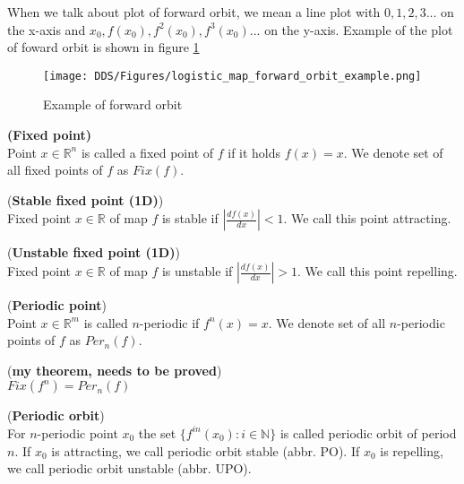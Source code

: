 \begin{remark}
    When we talk about plot of forward orbit, we mean a line plot with
    $0, 1, 2, 3...$ on the x-axis and $x_0, f(x_0), f^2(x_0), f^3(x_0)...$ on the y-axis.
    Example of the plot of foward orbit is shown in figure \ref{fig:forward_orbit_example}
\end{remark}

\begin{figure}[!h]
    \centering
    \texttt{[image: DDS/Figures/logistic\_map\_forward\_orbit\_example.png]}
    \caption{Example of forward orbit}
    \label{fig:forward_orbit_example}
\end{figure}


\begin{definition} \textbf{(Fixed point)} \\
    \label{def:fixed point}
    Point $x \in \mathbb{R}^n$ is called a fixed point of $f$ if it holds $f(x) = x$.
    We denote set of all fixed points of $f$ as $Fix(f)$. \cite{Devaney20211026}
\end{definition}

\begin{definition} (\textbf{Stable fixed point (1D)})\\
    Fixed point $x \in \mathbb{R}$ of map $f$ is stable if $|\frac{d{f(x)}}{dx}| < 1$.
    We call this point attracting.
\end{definition}

\begin{definition} (\textbf{Unstable fixed point (1D)})\\
    Fixed point $x \in \mathbb{R}$ of map $f$ is unstable if $|\frac{d{f(x)}}{dx}| > 1$.
    We call this point repelling.
\end{definition}

\begin{definition} (\textbf{Periodic point})\\
    Point $x \in \mathbb{R}^m$ is called $n$-periodic if $f^{n}(x)=x$.
    We denote set of all $n$-periodic points of $f$ as $Per_{n}(f)$. \cite{Devaney20211026}
\end{definition}

\begin{theorem} (\textbf{my theorem, needs to be proved})\\
$Fix(f^n) = Per_n(f)$
\end{theorem}

\begin{definition} (\textbf{Periodic orbit})\\
    For $n$-periodic point $x_0$ the set $\{f^{in}(x_0):i \in \mathbb{N}\}$ is called periodic orbit of period $n$.
    If $x_0$ is attracting, we call periodic orbit stable (abbr. PO).
    If $x_0$ is repelling, we call periodic orbit unstable (abbr. UPO).
\end{definition}

